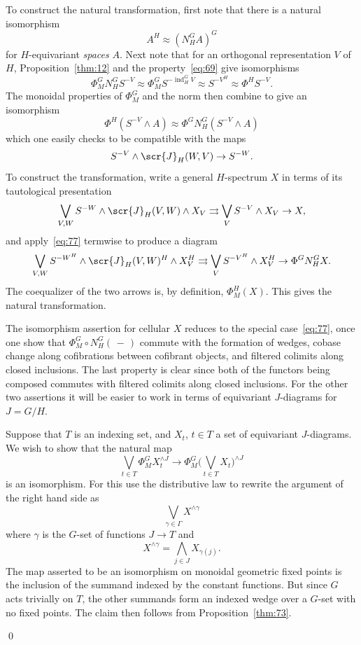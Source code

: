 \documentclass{amsart}
\theoremstyle{definition}
\theoremstyle{remark}
\newenvironment{pf}{\bigskip{\em Proof:\/}}{\qed\medskip}
\newcommand{\slot}{\,-\,}
\newcommand{\norm}{N}
\newcommand{\gfp}[1]{\Phi^{#1}}
\newcommand{\gfpm}[1]{\Phi_{M}^{#1}}
\newcommand{\phig}{\gfp{G}}
\newcommand{\phigm}{\gfpm{G}}
\newcommand{\phihm}{\gfpm{H}}
\newcommand{\phih}{\gfp{H}}
\DeclareMathOperator{\ind}{ind}
\newcommand{\icat}{\scr{J}}
\newcommand{\igcat}[1]{\icat_{#1}}
\begin{document}
\begin{pf}
To construct the natural transformation, first note that there is a
natural isomorphism 
\[
A^{H}\approx (\norm_{H}^{G}A)^{G}
\]
for $H$-equivariant {\em spaces} $A$.  Next note that for an
orthogonal representation $V$ of $H$, Proposition~\ref{thm:12} and the
property~\eqref{eq:69} give isomorphisms
\[
\phigm\norm_{H}^{G}S^{-V}\approx \phigm
S^{-\ind_{H}^{G}V} \approx S^{-V^{H}}\approx \Phi^{H} S^{-V}.
\]
The monoidal properties of $\phigm$ and the norm then combine to give
an isomorphism
\begin{equation}
\label{eq:77}
\phih (S^{-V}\wedge A)\approx
\phig \norm_{H}^{G}(S^{-V}\wedge A)
\end{equation}
which one easily checks to be compatible with the maps
\[
S^{-V}\wedge\igcat{H}(W,V) \to S^{-W}.
\]
To construct the transformation, write a general $H$-spectrum $X$ in
terms of its tautological presentation
\[
\bigvee_{V,W}S^{-W}\wedge \igcat{H}(V,W)\wedge X_{V} \rightrightarrows
\bigvee_{V}S^{-V}\wedge X_{V} \to X,
\]
and apply~\eqref{eq:77} termwise to produce a diagram 
\[
\bigvee_{V,W}S^{-W^{H}}\wedge \igcat{H}(V,W)^{H}\wedge X_{V}^{H} \rightrightarrows
\bigvee_{V}S^{-V^{H}}\wedge X_{V}^{H} \to \phig\norm_{H}^{G} X.
\]
The coequalizer of the two arrows is, by definition,  $\phihm(X)$.
This gives the natural transformation.   

The isomorphism assertion for cellular $X$ reduces to the special
case~\eqref{eq:77}, once one show that $\phigm\circ
\norm_{H}^{G}(\slot)$ commute with the formation of wedges, cobase
change along cofibrations between cofibrant objects, and filtered
colimits along closed inclusions.  The last property is clear since
both of the functors being composed commutes with filtered colimits
along closed inclusions.  For the other two assertions it will be
easier to work in terms of equivariant $J$-diagrams for $J=G/H$.

Suppose that $T$ is an indexing set, and $X_{t}$, $t\in T$ a set of
equivariant $J$-diagrams.  We wish to show that the natural map
\begin{equation}
\label{eq:187}
\bigvee_{t\in T}\phigm X_{t}^{\wedge J} \to 
\phigm\big(\bigvee_{t\in T}X_{t}\big)^{\wedge J}
\end{equation}
is an isomorphism.  For this use the distributive law to rewrite the
argument of the right hand side as
\[
\bigvee_{\gamma\in \Gamma} X^{\wedge \gamma}
\]
where $\gamma$ is the $G$-set of functions $J\to T$ and 
\[
X^{\wedge \gamma} = \bigwedge_{j\in J} X_{\gamma(j)}.
\]
The map asserted to be an isomorphism on monoidal geometric fixed
points is the inclusion of the summand indexed by the constant
functions.  But since $G$ acts trivially on $T$, the other summands
form an indexed wedge over a $G$-set with no fixed points.  The claim
then follows from Proposition~\ref{thm:73}.


\end{pf}
\end{document}
